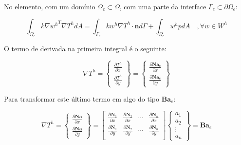         No elemento, com um domínio $\Omega_e \subset \Omega$, com uma parte da interface $\Gamma_e \subset \partial \Omega_e$:

        \begin{equation}
            \int_{\Omega_e} k \nabla {w^h}^T \nabla T^h  dA = 
            \int_{\Gamma_e} k w^h\nabla T^h \cdot \mathbf{n} d\Gamma
             + \int_{\Omega_e} w^h p dA \quad ,\forall w \in W^h
             \label{eq:calor_fraca_elemento}
        \end{equation}

        O termo de derivada na primeira integral é o seguinte:

        \begin{equation*}
            \nabla T^h =  
            \begin{Bmatrix}
                \frac{\partial T^h}{\partial x}\\
                \frac{\partial T^h}{\partial y}
            \end{Bmatrix} =
            \begin{Bmatrix}
                \frac{\partial \mathbf{N} \mathbf{a}_e}{\partial x}\\
                \frac{\partial \mathbf{N} \mathbf{a}_e}{\partial y}
            \end{Bmatrix}
        \end{equation*}

        Para transformar este último termo em algo do tipo $\mathbf{B} \mathbf{a}_e$:

        \begin{equation}
            \nabla T^h =  
            \begin{Bmatrix}
                \frac{\partial \mathbf{N} \mathbf{a}}{\partial x}\\
                \frac{\partial \mathbf{N} \mathbf{a}}{\partial y}
            \end{Bmatrix} =
            \begin{bmatrix}
                \frac{\partial \mathbf{N}_1}{\partial x} & \frac{\partial \mathbf{N}_2}{\partial x} & \cdots & \frac{\partial \mathbf{N}_n}{\partial x}\\
                \frac{\partial \mathbf{N}_1}{\partial y} & \frac{\partial \mathbf{N}_2}{\partial y} & \cdots & \frac{\partial \mathbf{N}_n}{\partial y}\\
            \end{bmatrix}
            \begin{Bmatrix}
                a_1\\
                a_2\\
                \vdots\\
                a_n
            \end{Bmatrix}
            = 
            \mathbf{B}
            \mathbf{a}_e
            \label{eq:calor_B}
        \end{equation}


